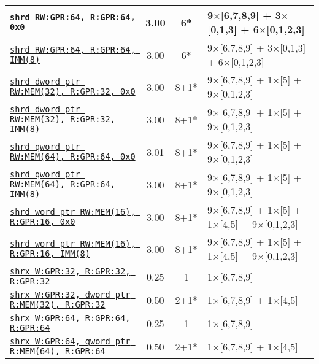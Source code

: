 \documentclass[a4paper,english,fontsize=9]{scrartcl}
\begin{document}
\begin{longtable}{p{}ccL{.25\textwidth}}
  \midrule
  \texttt{\href{https://felixcloutier.com/x86/SHRD.html}{shrd RW:GPR:64, R:GPR:64, 0x0}} & 3.00 & 6* & 9\(\times\)[6,7,8,9] + 3\(\times\)[0,1,3] + 6\(\times\)[0,1,2,3] \\
  \midrule
  \texttt{\href{https://felixcloutier.com/x86/SHRD.html}{shrd RW:GPR:64, R:GPR:64, IMM(8)}} & 3.00 & 6* & 9\(\times\)[6,7,8,9] + 3\(\times\)[0,1,3] + 6\(\times\)[0,1,2,3] \\
  \midrule
  \texttt{\href{https://felixcloutier.com/x86/SHRD.html}{shrd dword ptr RW:MEM(32), R:GPR:32, 0x0}} & 3.00 & 8+1* & 9\(\times\)[6,7,8,9] + 1\(\times\)[5] + 9\(\times\)[0,1,2,3] \\
  \midrule
  \texttt{\href{https://felixcloutier.com/x86/SHRD.html}{shrd dword ptr RW:MEM(32), R:GPR:32, IMM(8)}} & 3.00 & 8+1* & 9\(\times\)[6,7,8,9] + 1\(\times\)[5] + 9\(\times\)[0,1,2,3] \\
  \midrule
  \texttt{\href{https://felixcloutier.com/x86/SHRD.html}{shrd qword ptr RW:MEM(64), R:GPR:64, 0x0}} & 3.01 & 8+1* & 9\(\times\)[6,7,8,9] + 1\(\times\)[5] + 9\(\times\)[0,1,2,3] \\
  \midrule
  \texttt{\href{https://felixcloutier.com/x86/SHRD.html}{shrd qword ptr RW:MEM(64), R:GPR:64, IMM(8)}} & 3.00 & 8+1* & 9\(\times\)[6,7,8,9] + 1\(\times\)[5] + 9\(\times\)[0,1,2,3] \\
  \midrule
  \texttt{\href{https://felixcloutier.com/x86/SHRD.html}{shrd word ptr RW:MEM(16), R:GPR:16, 0x0}} & 3.00 & 8+1* & 9\(\times\)[6,7,8,9] + 1\(\times\)[5] + 1\(\times\)[4,5] + 9\(\times\)[0,1,2,3] \\
  \midrule
  \texttt{\href{https://felixcloutier.com/x86/SHRD.html}{shrd word ptr RW:MEM(16), R:GPR:16, IMM(8)}} & 3.00 & 8+1* & 9\(\times\)[6,7,8,9] + 1\(\times\)[5] + 1\(\times\)[4,5] + 9\(\times\)[0,1,2,3] \\
  \midrule
  \texttt{\href{https://felixcloutier.com/x86/SARX:SHLX:SHRX.html}{shrx W:GPR:32, R:GPR:32, R:GPR:32}} & 0.25 & 1 & 1\(\times\)[6,7,8,9] \\
  \midrule
  \texttt{\href{https://felixcloutier.com/x86/SARX:SHLX:SHRX.html}{shrx W:GPR:32, dword ptr R:MEM(32), R:GPR:32}} & 0.50 & 2+1* & 1\(\times\)[6,7,8,9] + 1\(\times\)[4,5] \\
  \midrule
  \texttt{\href{https://felixcloutier.com/x86/SARX:SHLX:SHRX.html}{shrx W:GPR:64, R:GPR:64, R:GPR:64}} & 0.25 & 1 & 1\(\times\)[6,7,8,9] \\
  \midrule
  \texttt{\href{https://felixcloutier.com/x86/SARX:SHLX:SHRX.html}{shrx W:GPR:64, qword ptr R:MEM(64), R:GPR:64}} & 0.50 & 2+1* & 1\(\times\)[6,7,8,9] + 1\(\times\)[4,5] \\

\end{longtable}
\end{document}
